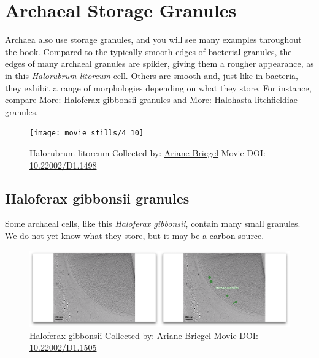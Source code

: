 \documentclass[]{tufte-book}
\begin{document}
\section{Archaeal Storage Granules}\label{archaeal-storage-granules}

Archaea also use storage granules, and you will see many examples
throughout the book. Compared to the typically-smooth edges of bacterial
granules, the edges of many archaeal granules are spikier, giving them a
rougher appearance, as in this \emph{Halorubrum litoreum} cell. Others
are smooth and, just like in bacteria, they exhibit a range of
morphologies depending on what they store. For instance, compare
\protect\hyperlink{Haloferax_gibbonsii_granules}{More: Haloferax
gibbonsii granules} and
\protect\hyperlink{Halohasta_litchfieldiae_granules}{More: Halohasta
litchfieldiae granules}.





\begin{figure}
\texttt{[image: movie\_stills/4\_10]} \caption[Halorubrum litoreum Collected by:
\protect\hyperlink{ariane_briegel}{Ariane Briegel} Movie DOI:
\href{https://doi.org/10.22002/D1.1498}{10.22002/D1.1498}]{Halorubrum litoreum Collected by:
\protect\hyperlink{ariane_briegel}{Ariane Briegel} Movie DOI:
\href{https://doi.org/10.22002/D1.1498}{10.22002/D1.1498}}\label{fig:4-10}
\end{figure}

\hypertarget{Haloferax_gibbonsii_granules}{\subsection{Haloferax
gibbonsii granules}\label{Haloferax_gibbonsii_granules}}

Some archaeal cells, like this \emph{Haloferax gibbonsii}, contain many
small granules. We do not yet know what they store, but it may be a
carbon source.





\begin{figure}
\includegraphics{movie_stills/4_10a} \caption[Haloferax gibbonsii Collected by:
\protect\hyperlink{ariane_briegel}{Ariane Briegel} Movie DOI:
\href{https://doi.org/10.22002/D1.1505}{10.22002/D1.1505}]{Haloferax gibbonsii Collected by:
\protect\hyperlink{ariane_briegel}{Ariane Briegel} Movie DOI:
\href{https://doi.org/10.22002/D1.1505}{10.22002/D1.1505}}\label{fig:4-10a}
\end{figure}
\end{document}
